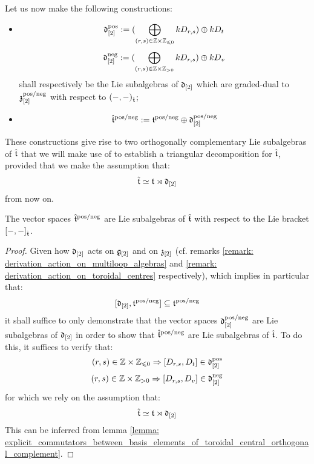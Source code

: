         Let us now make the following constructions:
        \begin{itemize}
            \item
                $$\d_{[2]}^{\positive} := ( \bigoplus_{(r, s) \in \Z \x \Z_{\leq 0} } k D_{r, s} ) \oplus k D_t$$
                $$\d_{[2]}^{\negative} := ( \bigoplus_{(r, s) \in \Z \x \Z_{> 0} } k D_{r, s} ) \oplus k D_v$$
            shall respectively be the Lie subalgebras of $\mathfrak{d}_{[2]}$ which are graded-dual to $\mathfrak{z}_{[2]}^{\mathrm{pos}/\mathrm{neg}}$ with respect to $(-, -)_{\hat{\mathfrak{t}}}$;
            \item
                $$\hat{\mathfrak{t}}^{\mathrm{pos}/\mathrm{neg}} := \mathfrak{t}^{\mathrm{pos}/\mathrm{neg}} \oplus \mathfrak{d}_{[2]}^{\mathrm{pos}/\mathrm{neg}}$$
        \end{itemize}
        These constructions give rise to two orthogonally complementary Lie subalgebras of $\hat{\mathfrak{t}}$ that we will make use of to establish a triangular decomposition for $\hat{\mathfrak{t}}$, provided that we make the assumption that:
            $$\hat{\mathfrak{t}} \simeq \mathfrak{t} \rtimes \mathfrak{d}_{[2]}$$
        from now on.
        
        \begin{lemma} \label{lemma: positive/negative_extended_toroidal_lie_algebras}
            The vector spaces $\hat{\mathfrak{t}}^{\mathrm{pos}/\mathrm{neg}}$ are Lie subalgebras of $\hat{\mathfrak{t}}$ with respect to the Lie bracket $[-, -]_{\hat{\mathfrak{t}}}$.
        \end{lemma}
            \begin{proof}
                Given how $\mathfrak{d}_{[2]}$ acts on $\mathfrak{g}_{[2]}$ and on $\mathfrak{z}_{[2]}$ (cf. remarks \ref{remark: derivation_action_on_multiloop_algebras} and \ref{remark: derivation_action_on_toroidal_centres} respectively), which implies in particular that:
                    $$[\mathfrak{d}_{[2]}, \mathfrak{t}^{\mathrm{pos}/\mathrm{neg}}] \subseteq \mathfrak{t}^{\mathrm{pos}/\mathrm{neg}}$$
                it shall suffice to only demonstrate that the vector spaces $\mathfrak{d}_{[2]}^{\mathrm{pos}/\mathrm{neg}}$ are Lie subalgebras of $\mathfrak{d}_{[2]}$ in order to show that $\hat{\mathfrak{t}}^{\mathrm{pos}/\mathrm{neg}}$ are Lie subalgebras of $\hat{\mathfrak{t}}$. To do this, it suffices to verify that:
                    $$(r, s) \in \Z \x \Z_{\leq 0} \implies [D_{r, s}, D_t] \in \d_{[2]}^{\positive}$$
                    $$(r, s) \in \Z \x \Z_{> 0} \implies [D_{r, s}, D_v] \in \d_{[2]}^{\negative}$$
                for which we rely on the assumption that:
                    $$\hat{\mathfrak{t}} \simeq \mathfrak{t} \rtimes \mathfrak{d}_{[2]}$$
                This can be inferred from lemma \ref{lemma: explicit_commutators_between_basis_elements_of_toroidal_central_orthogonal_complement}.
            \end{proof}

